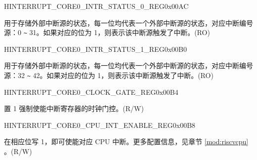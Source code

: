 \begin{register}{H}{INTERRUPT\_CORE0\_INTR\_STATUS\_0\_REG}{0x00AC}\label{regdesc:INTERRUPTCORE0INTRSTATUS0REG}
%
\regnewline%
\begin{regdesc}\begin{reglist}
\label{fielddesc:INTERRUPTCORE0INTRSTATUS0}\item [INTERRUPT\_CORE0\_INTR\_STATUS\_0] 用于存储外部中断源的状态，每一位均代表一个外部中断源的状态，对应中断编号源：0 \verb+~+ 31。如果对应的位为 1，则表示该中断源触发了中断。(RO)
\end{reglist}\end{regdesc}
\end{register}


\begin{register}{H}{INTERRUPT\_CORE0\_INTR\_STATUS\_1\_REG}{0x00B0}\label{regdesc:INTERRUPTCORE0INTRSTATUS1REG}
%
\regnewline%
\begin{regdesc}\begin{reglist}
\label{fielddesc:INTERRUPTCORE0INTRSTATUS1}\item [INTERRUPT\_CORE0\_INTR\_STATUS\_1] 用于存储外部中断源的状态，每一位均代表一个外部中断源的状态，对应中断编号源：32 \verb+~+ 42。如果对应的位为 1，则表示该中断源触发了中断。(RO)
\end{reglist}\end{regdesc}
\end{register}


\begin{register}{H}{INTERRUPT\_CORE0\_CLOCK\_GATE\_REG}{0x00B4}\label{regdesc:INTERRUPTCORE0CLOCKGATEREG}
%
%
\regnewline%
\begin{regdesc}\begin{reglist}
\label{fielddesc:INTERRUPTCORE0CLKEN}\item [INTERRUPT\_CORE0\_CLK\_EN] 置 1 强制使能中断寄存器的时钟门控。(R/W)

\end{reglist}\end{regdesc}
\end{register}


\begin{register}{H}{INTERRUPT\_CORE0\_CPU\_INT\_ENABLE\_REG}{0x00B8}\label{regdesc:INTERRUPTCORE0CPUINTENABLEREG}
%
\regnewline%
\begin{regdesc}\begin{reglist}
\label{fielddesc:INTERRUPTCORE0CPUINTENABLE}\item [INTERRUPT\_CORE0\_CPU\_INT\_ENABLE] 在相应位写 1，即可使能对应 CPU 中断。更多配置信息，见章节 \ref{mod:riscvcpu} \textit{}。(R/W)
\end{reglist}\end{regdesc}
\end{register}


